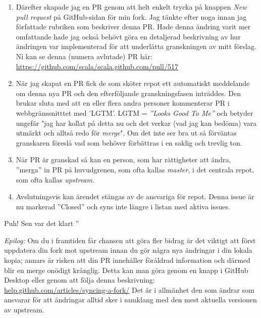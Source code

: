 \begin{enumerate}
\item Därefter skapade jag en PR genom att helt enkelt trycka på knappen \emph{New pull request} på GitHub-sidan för min fork. Jag tänkte efter noga innan jag författade rubriken som beskriver denna PR. Hade denna ändring varit mer omfattande hade jag också behövt göra en detaljerad beskrivning av hur ändringen var implementerad för att underlätta granskningen av mitt förslag. Ni kan se denna (numera avlutade) PR här: \\{\url{https://github.com/scala/scala.github.com/pull/517}}

\item När jag skapat en PR fick de som sköter repot ett automatiskt meddelande om denna nya PR och den efterföljande granskningsfasen inträddes. Den brukar sluta med att en eller flera andra personer kommenterar PR i webbgränssnitttet med 'LGTM'. LGTM = \emph{''Looks Good To Me''} och betyder ungefär "jag har kollat på detta nu och det verkar (vad jag kan bedöma) vara utmärkt och alltså redo för \emph{merge}". Om det inte ser bra ut så förväntas granskaren föreslå vad som behöver förbättras i en saklig och trevlig ton.

\item När PR är granskad så kan en person, som har rättigheter att ändra, ''merga'' in PR på huvudgrenen, som ofta kallas \emph{master}, i det centrala repot, som ofta kallas \emph{upstream}.

\item Avslutningsvis kan ärendet stängas av de ansvariga för repot. Denna issue är nu markerad ''Closed'' och syns inte längre i listan med aktiva issues.

\end{enumerate}

Puh! Sen var det klart \code{:)} ''

\vspace{1em}\noindent\emph{Epilog:} Om du i framtiden får chansen att göra fler bidrag är det viktigt att först uppdatera din fork mot upstream innan du gör några nya ändringar i din lokala kopia; annars är risken att din PR innehåller föråldrad information och därmed blir en merge onödigt krånglig. Detta kan man göra genom en knapp i GitHub Desktop eller genom att följa denna beskrivning: \href{https://help.github.com/articles/syncing-a-fork/}{help.github.com/articles/syncing-a-fork/} Det är i allmänhet den som ändrar som ansvarar för att ändringar alltid sker i samklang med den mest aktuella versionen av upstream.
